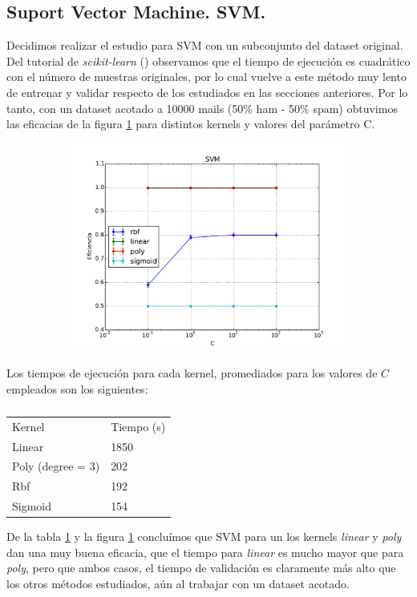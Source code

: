 \documentclass[a4paper,10pt]{article}
\begin{document}
\subsection{Suport Vector Machine. SVM.}

\par Decidimos realizar el estudio para SVM con un subconjunto del dataset original. Del tutorial de \emph{scikit-learn} (\cite{sklearn}) observamos que el tiempo de ejecución es cuadrático con el número de muestras originales, por lo cual vuelve a este método muy lento de entrenar y validar respecto de los estudiados en las secciones anteriores. Por lo tanto, con un dataset acotado a 10000 mails (50\% ham - 50\% spam) obtuvimos las eficacias de la figura \ref{fig:svm} para distintos kernels y valores del parámetro C.

\begin{figure}[H]
  \centering
  \begin{subfigure}[b]{0.4\textwidth}
    \includegraphics[width=\textwidth]{../imagenes/SVM}
     \caption{}
  \end{subfigure}
  \label{fig:svm}
\end{figure}

\par Los tiempos de ejecución para cada kernel, promediados para los valores de $C$ empleados son los siguientes:
\begin{table}
\centering
\caption{}
\label{table:time_svm}
\begin{tabular}{ll}
Kernel & Tiempo (s) \\
Linear & 1850 \\
Poly (degree = 3) & 202 \\
Rbf & 192 \\
Sigmoid & 154 \\
\end{tabular}
\end{table}
De la tabla \ref{table:time_svm} y la figura \ref{fig:svm} concluímos que SVM para un los kernels \emph{linear} y \emph{poly} dan una muy buena eficacia, que el tiempo para \emph{linear} es mucho mayor que para \emph{poly}, pero que ambos casos, el tiempo de validación es claramente más alto que los otros métodos estudiados, aún al trabajar con un dataset acotado.
\end{document}
